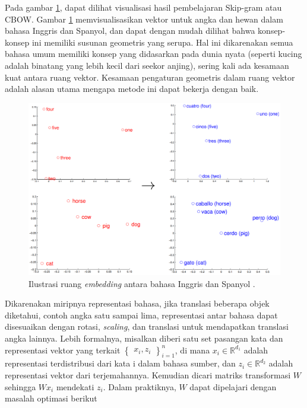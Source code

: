     Pada gambar \ref{fig:ilustrasi_embedding_inggris_spanyol}, dapat dilihat visualisasi hasil pembelajaran Skip-gram atau CBOW. Gambar \ref{fig:ilustrasi_embedding_inggris_spanyol} memvisualisasikan vektor untuk angka dan hewan dalam bahasa Inggris dan Spanyol, dan dapat dengan mudah dilihat bahwa konsep-konsep ini memiliki susunan geometris yang serupa. Hal ini dikarenakan semua bahasa umum memiliki konsep yang didasarkan pada dunia nyata (seperti kucing adalah binatang yang lebih kecil dari seekor anjing), sering kali ada kesamaan kuat antara ruang vektor. Kesamaan pengaturan geometris dalam ruang vektor adalah alasan utama mengapa metode ini dapat bekerja dengan baik.

    \begin{figure}[ht]
        \centering
        \includegraphics[width=1\textwidth]{resources/ilustration-eng-spn-word.png}
        \caption{Ilustrasi ruang \textit{embedding} antara bahasa Inggris dan Spanyol \parencite{MikolovExploiting}.}
        \label{fig:ilustrasi_embedding_inggris_spanyol}
    \end{figure}

    Dikarenakan miripnya representasi bahasa, jika translasi beberapa objek diketahui, contoh angka satu sampai lima, representasi antar bahasa dapat disesuaikan dengan rotasi, \textit{scaling}, dan translasi untuk mendapatkan translasi angka lainnya. Lebih formalnya, misalkan diberi satu set pasangan kata dan representasi vektor yang terkait \begin{math} \begin{Bmatrix} {x_{i}, z_{i}} \end{Bmatrix}_{i=1}^{n} \end{math}, di mana \(x_{i}\in\mathbb{R}^{d_{1}}\) adalah representasi terdistribusi dari kata i dalam bahasa sumber, dan \(z_{i}\in\mathbb{R}^{d_{2}}\) adalah representasi vektor dari terjemahannya. Kemudian dicari matriks transformasi \( W\) sehingga \(W x_{i}\) mendekati \(z_{i}\). Dalam praktiknya, \(W\) dapat dipelajari dengan masalah optimasi berikut

